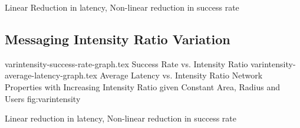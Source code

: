 Linear Reduction in latency, Non-linear reduction in success rate

\subsection{Messaging Intensity Ratio Variation}
\sidebysidefigures
{varintensity-success-rate-graph.tex}      {Success Rate vs. Intensity Ratio}
{varintensity-average-latency-graph.tex}   {Average Latency vs. Intensity Ratio}
{Network Properties with Increasing Intensity Ratio given Constant Area, Radius and Users}
{fig:varintensity}

Linear reduction in latency, Non-linear reduction in success rate
